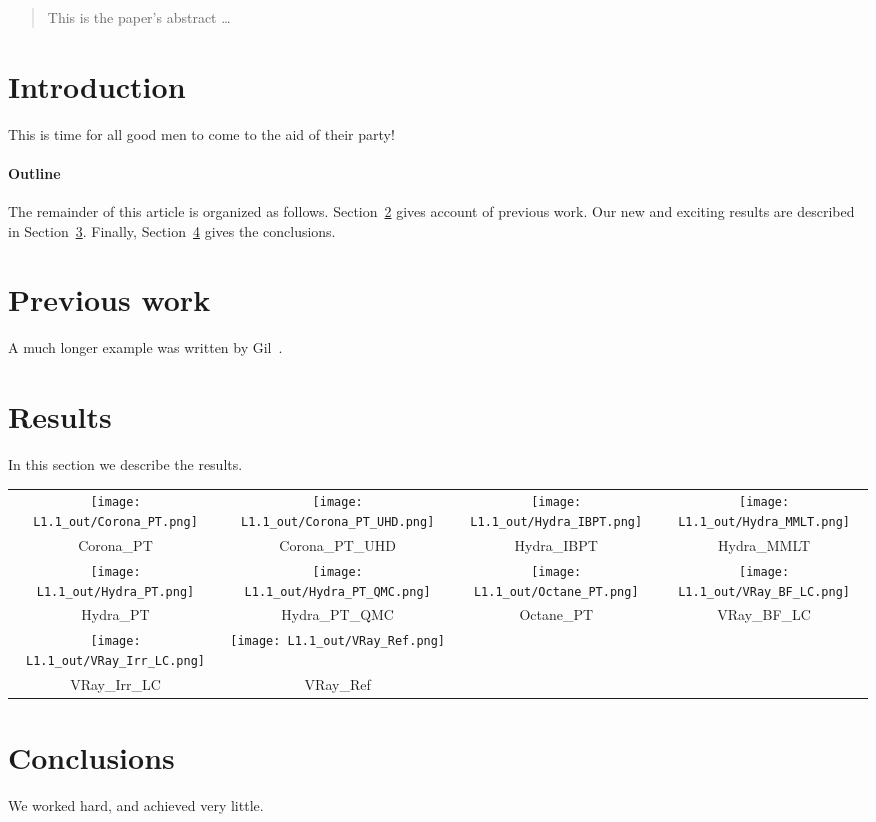 \documentclass[12pt]{article}
\begin{document}
\maketitle

\begin{abstract}
This is the paper's abstract \ldots
\end{abstract}

\section{Introduction}
This is time for all good men to come to the aid of their party!

\paragraph{Outline}
The remainder of this article is organized as follows.
Section~\ref{previous work} gives account of previous work.
Our new and exciting results are described in Section~\ref{results}.
Finally, Section~\ref{conclusions} gives the conclusions.

\section{Previous work}\label{previous work}
A much longer \LaTeXe{} example was written by Gil~\cite{Gil:02}.

\section{Results}\label{results}
In this section we describe the results.

\hspace{2pt}

\begin{tabular}{c c c c}
\texttt{[image: L1.1\_out/Corona\_PT.png]} & 
\texttt{[image: L1.1\_out/Corona\_PT\_UHD.png]} & 
\texttt{[image: L1.1\_out/Hydra\_IBPT.png]} & 
\texttt{[image: L1.1\_out/Hydra\_MMLT.png]}\\
Corona\_PT & 
Corona\_PT\_UHD & 
Hydra\_IBPT & 
Hydra\_MMLT\\

\texttt{[image: L1.1\_out/Hydra\_PT.png]} & 
\texttt{[image: L1.1\_out/Hydra\_PT\_QMC.png]} & 
\texttt{[image: L1.1\_out/Octane\_PT.png]} & 
\texttt{[image: L1.1\_out/VRay\_BF\_LC.png]}\\
Hydra\_PT & 
Hydra\_PT\_QMC & 
Octane\_PT & 
VRay\_BF\_LC\\

\texttt{[image: L1.1\_out/VRay\_Irr\_LC.png]} & 
\texttt{[image: L1.1\_out/VRay\_Ref.png]}\\
VRay\_Irr\_LC & 
VRay\_Ref

\end{tabular}

\section{Conclusions}\label{conclusions}
We worked hard, and achieved very little.



\end{document}
